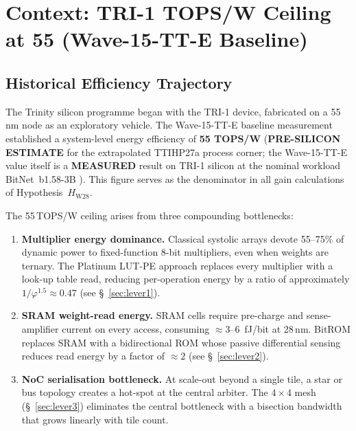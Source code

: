 \section{Context: TRI-1 TOPS/W Ceiling at 55 (Wave-15-TT-E Baseline)}
\label{sec:context}

\subsection{Historical Efficiency Trajectory}

The Trinity silicon programme began with the TRI-1 device, fabricated on a
55\,nm node as an exploratory vehicle.  The Wave-15-TT-E baseline measurement
established a system-level energy efficiency of \textbf{55 TOPS/W}
(\textbf{PRE-SILICON ESTIMATE} for the extrapolated TTIHP27a process corner;
the Wave-15-TT-E value itself is a \textbf{MEASURED} result on TRI-1 silicon
at the nominal workload BitNet~b1.58-3B \cite{bitnet_b158_2024}).  This figure
serves as the denominator in all gain calculations of Hypothesis~\(H_{\mathrm{W28}}\).

The 55\,TOPS/W ceiling arises from three compounding bottlenecks:

\begin{enumerate}
  \item \textbf{Multiplier energy dominance.}  Classical systolic arrays devote
    55--75\% of dynamic power to fixed-function 8-bit multipliers, even when
    weights are ternary.  The Platinum LUT-PE approach \cite{platinum_lut_pe_2026}
    replaces every multiplier with a look-up table read, reducing per-operation
    energy by a ratio of approximately \(1/\varphi^{1.5} \approx 0.47\)
    (see §~\ref{sec:lever1}).

  \item \textbf{SRAM weight-read energy.}  SRAM cells require pre-charge and
    sense-amplifier current on every access, consuming
    \(\approx 3\)--\(6\)~fJ/bit at 28\,nm.  BitROM \cite{bitrom_2025} replaces
    SRAM with a bidirectional ROM whose passive differential sensing reduces
    read energy by a factor of \(\approx 2\) (see §~\ref{sec:lever2}).

  \item \textbf{NoC serialisation bottleneck.}  At scale-out beyond a single
    tile, a star or bus topology creates a hot-spot at the central arbiter.
    The \(4\times4\) mesh (§~\ref{sec:lever3}) eliminates the central bottleneck
    with a bisection bandwidth that grows linearly with tile count.
\end{enumerate}


